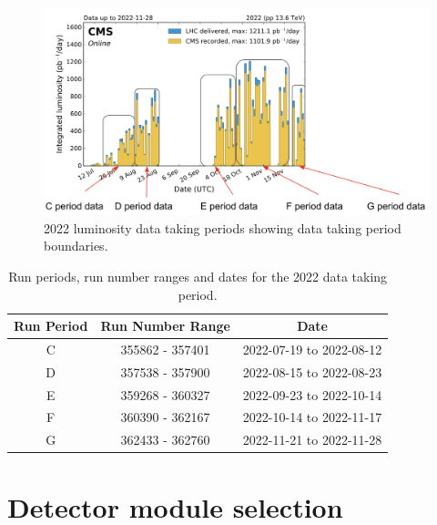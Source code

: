\begin{figure}[!htp]
  \centering
\includegraphics[width=1\textwidth]{ashish_thesis/2022_lumi_datasets.png}
\caption[2022 CMS luminosity data periods]{%
   2022 luminosity data taking periods showing data taking period boundaries.
}
\label{fig:period_bound_1}
\end{figure}


\begin{table}[h]
  \centering
  \caption[2022 run ranges]{Run periods, run number ranges and dates for the 2022 data taking period.}
\begin{tabular}{ccc}
\textbf{Run Period} & \textbf{Run Number Range} & \textbf{Date} \\
\hline
C & 355862 - 357401 & 2022-07-19 to 2022-08-12 \\
D & 357538 - 357900 & 2022-08-15 to 2022-08-23 \\
E & 359268 - 360327 & 2022-09-23 to 2022-10-14 \\
F & 360390 - 362167 & 2022-10-14 to 2022-11-17 \\
G & 362433 - 362760 & 2022-11-21 to 2022-11-28 \\
\end{tabular}
\label{tab:my_label_1}
\end{table}

\section{Detector module selection}

